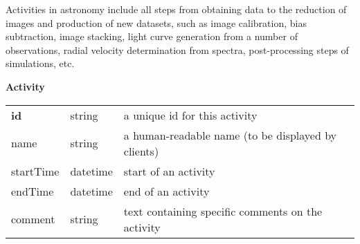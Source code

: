 Activities in astronomy include all steps from obtaining data to the reduction
of  images and production of new datasets, such as image calibration, bias
subtraction, image stacking, light curve generation from a number of
observations, radial velocity determination from spectra, post-processing steps
of simulations, etc.



\begin{table}[ht]
\small
{}\textwidth
\textbf{\normalsize Activity}\vspace{0.25em}\\
\begin{tabulary}{1.0\textwidth}{llL}
\toprule
{}  &  & \\
\midrule
\textbf{id}  & string & a unique id for this activity\\
name         & string & a human-readable name (to be displayed by clients)\\
startTime    & datetime & start of an activity\\
endTime      & datetime & end of an activity\\
comment      & string & text containing specific comments on the activity\\

\end{tabulary}
\end{table}
